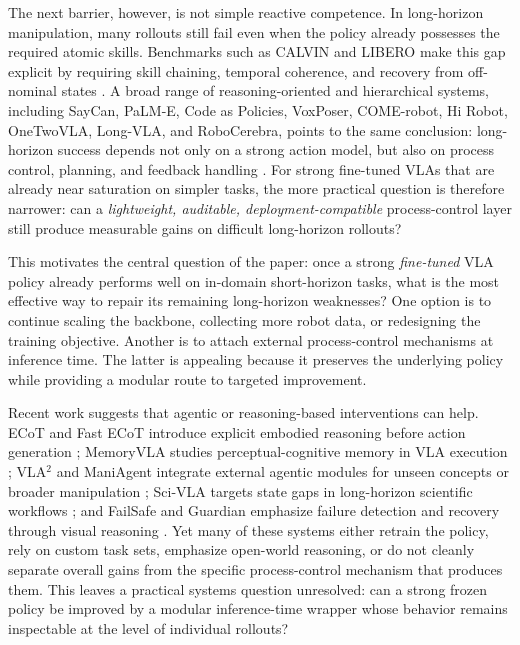 \documentclass[a4paper]{Template/LaTeX_Templates/waica}
\begin{document}
The next barrier, however, is not simple reactive competence. In long-horizon manipulation, many rollouts still fail even when the policy already possesses the required atomic skills. Benchmarks such as CALVIN and LIBERO make this gap explicit by requiring skill chaining, temporal coherence, and recovery from off-nominal states \cite{calvin,libero}. A broad range of reasoning-oriented and hierarchical systems, including SayCan, PaLM-E, Code as Policies, VoxPoser, COME-robot, Hi Robot, OneTwoVLA, Long-VLA, and RoboCerebra, points to the same conclusion: long-horizon success depends not only on a strong action model, but also on process control, planning, and feedback handling \cite{saycan,palme,codeaspolicies,voxposer,come,hirobot,onetwovla,longvla,robocerebra}. For strong fine-tuned VLAs that are already near saturation on simpler tasks, the more practical question is therefore narrower: can a \emph{lightweight, auditable, deployment-compatible} process-control layer still produce measurable gains on difficult long-horizon rollouts?

This motivates the central question of the paper: once a strong \emph{fine-tuned} VLA policy already performs well on in-domain short-horizon tasks, what is the most effective way to repair its remaining long-horizon weaknesses? One option is to continue scaling the backbone, collecting more robot data, or redesigning the training objective. Another is to attach external process-control mechanisms at inference time. The latter is appealing because it preserves the underlying policy while providing a modular route to targeted improvement.

Recent work suggests that agentic or reasoning-based interventions can help. ECoT and Fast ECoT introduce explicit embodied reasoning before action generation \cite{ecot,fastecot}; MemoryVLA studies perceptual-cognitive memory in VLA execution \cite{memoryvla}; VLA$^2$ and ManiAgent integrate external agentic modules for unseen concepts or broader manipulation \cite{vla2,maniagent}; Sci-VLA targets state gaps in long-horizon scientific workflows \cite{scivla}; and FailSafe and Guardian emphasize failure detection and recovery through visual reasoning \cite{failsafe,guardian}. Yet many of these systems either retrain the policy, rely on custom task sets, emphasize open-world reasoning, or do not cleanly separate overall gains from the specific process-control mechanism that produces them. This leaves a practical systems question unresolved: can a strong frozen policy be improved by a modular inference-time wrapper whose behavior remains inspectable at the level of individual rollouts?
\end{document}
